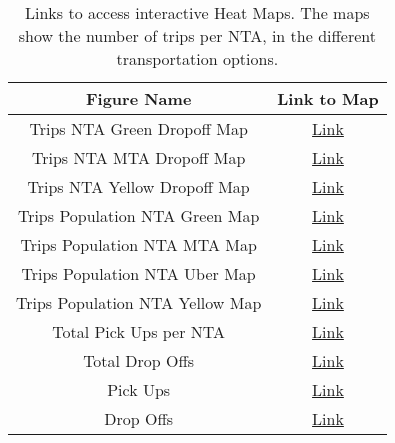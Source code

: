\begin{table}[h]
\begin{center}
\begin{tabular}{|c|c|}
\hline
\textbf{Figure Name}     & \textbf{Link to Map}  \\ 
\hline
Trips NTA Green Dropoff Map     & \href{https://marioceron-case-51.s3.amazonaws.com/datathon_html/trips_nta_green_dropoff_map.html}{Link}   \\
Trips NTA MTA Dropoff Map       & \href{https://marioceron-case-51.s3.amazonaws.com/datathon_html/trips_nta_mta_dropoff_map.html}{Link}   \\
Trips NTA Yellow Dropoff Map    & \href{https://marioceron-case-51.s3.amazonaws.com/datathon_html/trips_nta_yellow_dropoff_map.html}{Link}  \\
Trips Population NTA Green Map  & \href{https://marioceron-case-51.s3.amazonaws.com/datathon_html/trips_pop_nta_green_map.html}{Link}      \\
Trips Population NTA MTA Map    & \href{https://marioceron-case-51.s3.amazonaws.com/datathon_html/trips_pop_nta_mta_map.html}{Link}       \\
Trips Population NTA Uber Map  & \href{https://marioceron-case-51.s3.amazonaws.com/datathon_html/trips_pop_nta_uber_map.html}{Link}      \\
Trips Population NTA Yellow Map & \href{https://marioceron-case-51.s3.amazonaws.com/datathon_html/trips_pop_nta_yellow_map.html}{Link}\\

Total Pick Ups per NTA & \href{https://marioceron-case-51.s3.amazonaws.com/datathon_html/trips_nta_total_pickup.html}{Link}\\
Total Drop Offs & \href{https://marioceron-case-51.s3.amazonaws.com/datathon_html/trips_nta_max_coverage_dropoff.html}{Link}\\
Pick Ups & \href{https://marioceron-case-51.s3.amazonaws.com/datathon_html/trips_nta_max_coverage.html}{Link}\\
Drop Offs & \href{https://marioceron-case-51.s3.amazonaws.com/datathon_html/trips_nta_max_coverage_dropoff.html}{Link}\\
 \hline
\end{tabular}
 \caption{Links to access interactive Heat Maps. The maps show the number of trips per NTA, in the different transportation options.}
 \label{tab:dataset}
\end{center}
\end{table}



